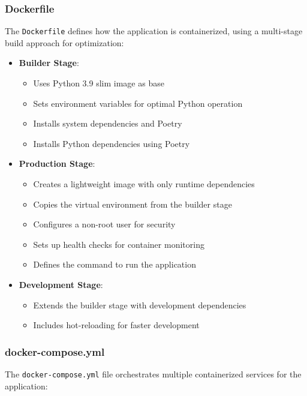\subsubsection{Dockerfile}
The \texttt{Dockerfile} defines how the application is containerized, using a multi-stage build approach for optimization:

\begin{itemize}
    \item \textbf{Builder Stage}:
    \begin{itemize}
        \item Uses Python 3.9 slim image as base
        \item Sets environment variables for optimal Python operation
        \item Installs system dependencies and Poetry
        \item Installs Python dependencies using Poetry
    \end{itemize}
    
    \item \textbf{Production Stage}:
    \begin{itemize}
        \item Creates a lightweight image with only runtime dependencies
        \item Copies the virtual environment from the builder stage
        \item Configures a non-root user for security
        \item Sets up health checks for container monitoring
        \item Defines the command to run the application
    \end{itemize}
    
    \item \textbf{Development Stage}:
    \begin{itemize}
        \item Extends the builder stage with development dependencies
        \item Includes hot-reloading for faster development
    \end{itemize}
\end{itemize}

\subsubsection{docker-compose.yml}
The \texttt{docker-compose.yml} file orchestrates multiple containerized services for the application:

